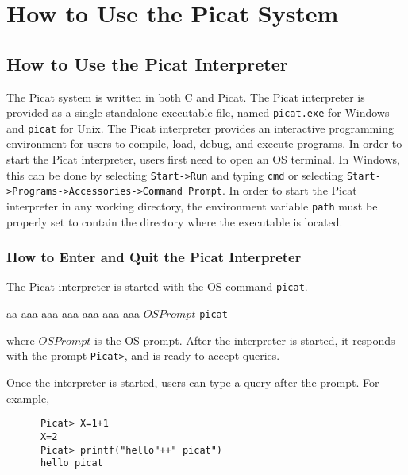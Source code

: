 \chapter{How to Use the Picat System}
\section{How to Use the Picat Interpreter}
The Picat system is written in both C and Picat. The Picat interpreter is provided as a single standalone executable file, named \texttt{picat.exe} for Windows and \texttt{picat} for Unix. The Picat interpreter provides an interactive programming environment for users to compile, load, debug, and execute programs. In order to start the Picat interpreter, users first need to open an OS terminal. In Windows, this can be done by selecting \verb+Start->Run+ and typing \verb+cmd+ or selecting \verb+Start->Programs->Accessories->Command Prompt+.  In order to start the Picat interpreter in any working directory, the environment variable \texttt{path} must be properly set to contain the directory where the executable is located.

\subsection{How to Enter and Quit the Picat Interpreter}
The Picat interpreter is started with the OS command \texttt{picat}. 
\begin{tabbing}
aa \= aaa \= aaa \= aaa \= aaa \= aaa \= aaa \kill
\> \> $OSPrompt$ \texttt{picat}
\end{tabbing}
where $OSPrompt$ is the OS prompt. After the interpreter is started, it responds with the prompt \verb+Picat>+, and is ready to accept queries. 

Once the interpreter is started, users can type a query after the prompt. For example,
\begin{verbatim}
      Picat> X=1+1
      X=2
      Picat> printf("hello"++" picat")
      hello picat
\end{verbatim}

